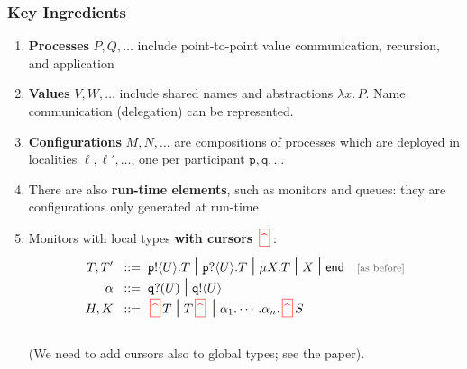 \documentclass[12pt]{beamer}
\newcommand{\typeIn}[2]{#1\inptype ( #2)}
\newcommand{\inptype}{\inpses}
\newcommand{\sepcolor}[1]{\textcolor{magenta}{#1}}
\newcommand{\sred}[1]{\textcolor{myred}{#1}}
\newcommand{\hidecolor}[1]{\textcolor{mygray}{#1}\xspace}
\newcommand{\notas}[1]{\hidecolor{{\footnotesize {[#1]}}}}
\newcommand{\queue}[1]{\lfloor #1 \rfloor}
\newcommand{\store}{\sigma}
\newcommand{\mysepp}{\,\cdot\,}
\newcommand{\mytilde}[1]{\widetilde{#1}}
\newcommand{\mytagg}{\spadesuit}
\newcommand{\codah}[4]{\coda{#1}{(#2\,\history\,#3)\!#4}}
\newcommand{\history}{\sepcolor{\mathbf{\star}}}
\newcommand{\coda}[2]{#1:#2}
\newcommand{\lend}{\mathsf{end}}
\newcommand{\gpart}[1]{\mathtt{#1}}
\newcommand{\monig}[4]{\ensuremath{{#1\queue{\textcolor{black}{#2}\mysepp #3\mysepp #4}^{\mytagg}}}}
\newcommand{\bnfis}{\;\;::=\;\;}
\def\sbnfbar{\;\mbox{\Large{$\mid$}}\;}
\newcommand{\past}{\,\text{\textcolor{red}{\textbf{\textasciicircum}}}\,}
\newcommand{\mypast}{\,\sred{\framebox[3mm]{\past}\,}}
\newcommand{\conf}[2]{\lbag #2 \rbag} %
\newcommand{\stack}[1]{\mathtt{#1}}
\newcommand{\ltout}[3]{\gpart{#1}!\langle#2\rangle.#3}
\newcommand{\ltinp}[3]{\gpart{#1}?\langle#2\rangle.#3}
\newcommand{\abs}[2]{\lambda #1.\,#2}
\newcommand{\outses}{!}
\newcommand{\inpses}{?}
\newcommand{\outtype}{\outses}
\newcommand{\typeOut}[2]{#1\outtype \langle #2\rangle}
\newcommand{\freev}[1]{\langle #1\rangle}
\newcommand{\boundv}[1]{(#1)}
\newcommand{\shsep}{.}
\newcommand{\bout}[2]{#1 \outses \freev{#2} \shsep}
\newcommand{\binp}[2]{#1 \inpses \boundv{#2} \shsep}
\newcommand{\p}{\ensuremath{\mathtt{p}}\xspace}
\newcommand{\q}{\ensuremath{\mathtt{q}}\xspace}
\newcommand{\np}[2]{#1:#2}
\newcommand{\ep}[2]{#1_{[#2]}}
\newcommand{\myloc}[2]{#1\left\{#2\right\}}
\newcommand{\loc}{\ell}
\begin{document}
\begin{frame}
\frametitle{Key Ingredients}
\begin{enumerate}[$\bullet$]
\item  \textbf{Processes} $P, Q, \ldots$ include point-to-point value communication, recursion, and application 
\item  \textbf{Values} $V, W, \ldots$ include shared names and abstractions $\abs{x}{P}$. 
Name communication (delegation) can be represented.
\item  \textbf{Configurations} $M, N, \ldots$ are compositions of processes which are deployed in localities $\loc, \loc', \ldots$, one per participant $\p, \q, \ldots$
\pause
\item  There are also \textbf{run-time elements}, such as monitors and queues: they are configurations only generated at run-time
\item Monitors with local   types \textbf{with cursors}  $\mypast$:
		\begin{align*}
			    	T, T'  \bnfis & \ltout{p}{U}{T} \sbnfbar \ltinp{p}{U}{T}   \sbnfbar  
		 \mu X. T \sbnfbar X \sbnfbar \lend  \quad \text{\notas{as before}}\\[-2mm]
				\alpha \bnfis &   \typeIn{\q}{U} \sbnfbar  \typeOut{\q}{U} \\[-2mm]
	H,K		 \bnfis & \mypast T \sbnfbar T\mypast \sbnfbar \alpha_1.\cdots .\alpha_n.\mypast S 
	\end{align*}
		\\ (We need to add cursors also to global types; see the paper).
\end{enumerate}


\end{frame}
\end{document}

